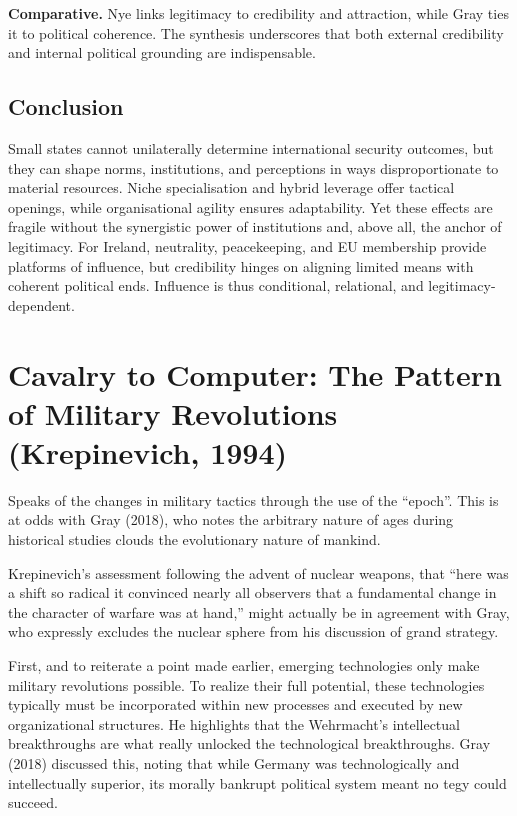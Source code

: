 \textbf{Comparative.} Nye links legitimacy to credibility and attraction, while Gray ties it to political coherence. The synthesis underscores that both external credibility and internal political grounding are indispensable.

\subsection*{Conclusion}
Small states cannot unilaterally determine international security outcomes, but they can shape norms, institutions, and perceptions in ways disproportionate to material resources. Niche specialisation and hybrid leverage offer tactical openings, while organisational agility ensures adaptability. Yet these effects are fragile without the synergistic power of institutions and, above all, the anchor of legitimacy. For Ireland, neutrality, peacekeeping, and EU membership provide platforms of influence, but credibility hinges on aligning limited means with coherent political ends. Influence is thus conditional, relational, and legitimacy-dependent.



\section*{Cavalry to Computer: The Pattern of Military Revolutions (Krepinevich, 1994)}

\parencite{KREPINEVICH_1994}Speaks of the changes in military tactics through the use of the ``epoch''. This is at odds with Gray (2018), who notes the arbitrary nature of ages during historical studies clouds the evolutionary nature of mankind.  

Krepinevich’s assessment following the advent of nuclear weapons, that ``here was a shift so radical it convinced nearly all observers that a fundamental change in the character of warfare was at hand,'' might actually be in agreement with Gray, who expressly excludes the nuclear sphere from his discussion of grand strategy.  

First, and to reiterate a point made earlier, emerging technologies only make military revolutions possible. To realize their full potential, these technologies typically must be incorporated within new processes and executed by new organizational structures. He highlights that the Wehrmacht's intellectual breakthroughs are what really unlocked the technological breakthroughs. Gray (2018) discussed this, noting that while Germany was technologically and intellectually superior, its morally bankrupt political system meant no tegy could succeed.  

